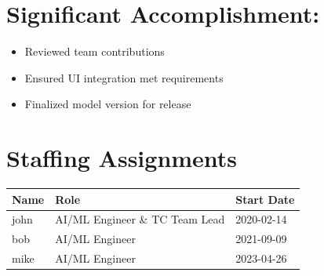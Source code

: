 \documentclass{article}
\begin{document}
\vspace{1.5cm}

\section*{ Significant Accomplishment: }
\label{sec:task_report_summary}

\begin{itemize}

  \item Reviewed team contributions

  \item Ensured UI integration met requirements

  \item Finalized model version for release

\end{itemize}

\vspace{1.5cm}


\section*{ Staffing Assignments }

\begin{tabular}{@{}p{5cm}p{6cm}p{4cm}@{}}
\toprule
\textbf{Name} & \textbf{Role} & \textbf{Start Date} \\
\midrule

john & AI/ML Engineer \& TC Team Lead & 2020-02-14 \\

bob & AI/ML Engineer & 2021-09-09 \\

mike & AI/ML Engineer & 2023-04-26 \\

\bottomrule
\end{tabular}



\end{document}

